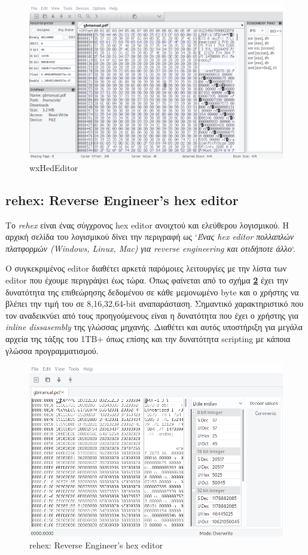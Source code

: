 \begin{figure}[ht]
\centering
\includegraphics[scale=0.5]{static/wxhex.png}
\caption{wxHedEditor}
\label{wx}
\end{figure}

\pagebreak
\subsection{rehex: Reverse Engineer's hex editor}
Το \emph{rehex} \cite{rehex} είναι ένας σύγχρονος hex editor ανοιχτού και ελεύθερου λογισμικού.
H αρχική σελίδα του λογισμικού δίνει την περιγραφή ως `\emph{Ένας hex editor πολλαπλών πλατφορμών (Windows, Linux, Mac) για reverse engineering και οτιδήποτε άλλο}`.

Ο συγκεκριμένος editor διαθέτει αρκετά παρόμοιες λειτουργίες με την λίστα των editor που έχουμε περιγράψει έως τώρα.
Όπως φαίνεται από το σχήμα \textbf{\ref{rehex}} έχει την δυνατότητα της επιθεώρησης δεδομένου σε κάθε μεμονωμένο byte και ο χρήστης να βλέπει την τιμή του σε 8,16,32,64-bit αναπαράσταση.
Σημαντικό χαρακτηριστικό που τον αναδεικνύει από τους προηγούμενους είναι η δυνατότητα που έχει ο χρήστης για \emph{inline dissasembly} της γλώσσας μηχανής.
Διαθέτει και αυτός υποστήριξη για μεγάλα αρχεία της τάξης του 1TB+ όπως επίσης και την δυνατότητα scripting με κάποια γλώσσα προγραμματισμού.

\begin{figure}[ht]
\centering
\includegraphics[scale=0.5]{static/rehex.png}
\caption{rehex: Reverse Engineer's hex editor}
\label{rehex}
\end{figure}

